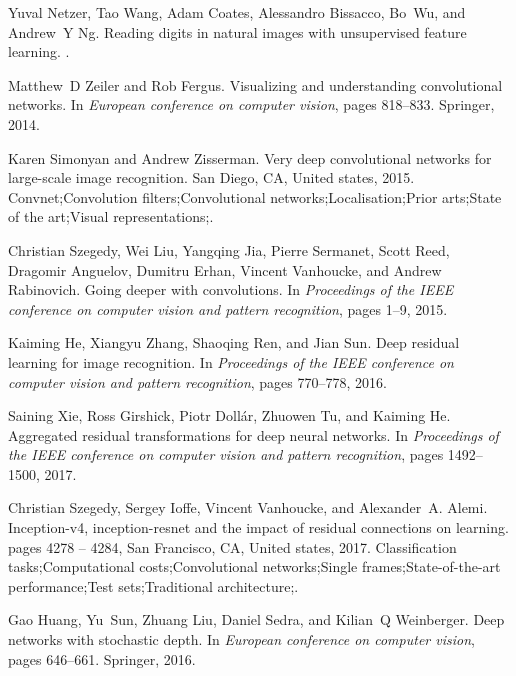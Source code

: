 \documentclass[review]{cvpr}
\begin{document}
{\begin{thebibliography}{10}
Yuval Netzer, Tao Wang, Adam Coates, Alessandro Bissacco, Bo~Wu, and Andrew~Y
  Ng.
\newblock Reading digits in natural images with unsupervised feature learning.
.


Matthew~D Zeiler and Rob Fergus.
\newblock Visualizing and understanding convolutional networks.
\newblock In {\em European conference on computer vision}, pages 818--833.
  Springer, 2014.

Karen Simonyan and Andrew Zisserman.
\newblock Very deep convolutional networks for large-scale image recognition.
\newblock San Diego, CA, United states, 2015.
\newblock Convnet;Convolution filters;Convolutional networks;Localisation;Prior
  arts;State of the art;Visual representations;.

Christian Szegedy, Wei Liu, Yangqing Jia, Pierre Sermanet, Scott Reed, Dragomir
  Anguelov, Dumitru Erhan, Vincent Vanhoucke, and Andrew Rabinovich.
\newblock Going deeper with convolutions.
\newblock In {\em Proceedings of the IEEE conference on computer vision and
  pattern recognition}, pages 1--9, 2015.


Kaiming He, Xiangyu Zhang, Shaoqing Ren, and Jian Sun.
\newblock Deep residual learning for image recognition.
\newblock In {\em Proceedings of the IEEE conference on computer vision and
  pattern recognition}, pages 770--778, 2016.



Saining Xie, Ross Girshick, Piotr Doll{\'a}r, Zhuowen Tu, and Kaiming He.
\newblock Aggregated residual transformations for deep neural networks.
\newblock In {\em Proceedings of the IEEE conference on computer vision and
  pattern recognition}, pages 1492--1500, 2017.



Christian Szegedy, Sergey Ioffe, Vincent Vanhoucke, and Alexander~A. Alemi.
\newblock Inception-v4, inception-resnet and the impact of residual connections
  on learning.
\newblock pages 4278 -- 4284, San Francisco, CA, United states, 2017.
\newblock Classification tasks;Computational costs;Convolutional
  networks;Single frames;State-of-the-art performance;Test sets;Traditional
  architecture;.


Gao Huang, Yu~Sun, Zhuang Liu, Daniel Sedra, and Kilian~Q Weinberger.
\newblock Deep networks with stochastic depth.
\newblock In {\em European conference on computer vision}, pages 646--661.
  Springer, 2016.




\end{thebibliography}}
\end{document}
